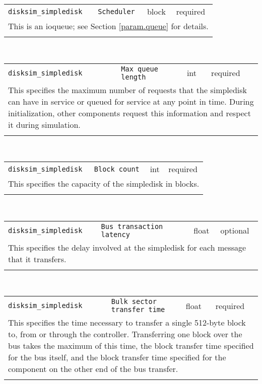 \noindent 
\begin{tabular}{|p{1.5in}|p{3.5in}|p{0.5in}|p{0.5in}|}
\cline{1-4}
\texttt{disksim\_simpledisk} & \texttt{Scheduler} & block & required \\ 
\cline{1-4}
\multicolumn{4}{|p{6in}|}{
This is an ioqueue; see Section \ref{param.queue} for details.
}\\ 
\cline{1-4}
\multicolumn{4}{p{5in}}{}\\
\end{tabular}\\ 
\noindent 
\begin{tabular}{|p{1.5in}|p{3.5in}|p{0.5in}|p{0.5in}|}
\cline{1-4}
\texttt{disksim\_simpledisk} & \texttt{Max queue length} & int & required \\ 
\cline{1-4}
\multicolumn{4}{|p{6in}|}{
This specifies the maximum number of requests that the simpledisk can have
in service or queued for service at any point in time. During
initialization, other components request this information and respect
it during simulation.
}\\ 
\cline{1-4}
\multicolumn{4}{p{5in}}{}\\
\end{tabular}\\ 
\noindent 
\begin{tabular}{|p{1.5in}|p{3.5in}|p{0.5in}|p{0.5in}|}
\cline{1-4}
\texttt{disksim\_simpledisk} & \texttt{Block count} & int & required \\ 
\cline{1-4}
\multicolumn{4}{|p{6in}|}{
This specifies the capacity of the simpledisk in blocks.
}\\ 
\cline{1-4}
\multicolumn{4}{p{5in}}{}\\
\end{tabular}\\ 
\noindent 
\begin{tabular}{|p{1.5in}|p{3.5in}|p{0.5in}|p{0.5in}|}
\cline{1-4}
\texttt{disksim\_simpledisk} & \texttt{Bus transaction latency} & float & optional \\ 
\cline{1-4}
\multicolumn{4}{|p{6in}|}{
This specifies the delay involved at the simpledisk for each message that
it transfers.
}\\ 
\cline{1-4}
\multicolumn{4}{p{5in}}{}\\
\end{tabular}\\ 
\noindent 
\begin{tabular}{|p{1.5in}|p{3.5in}|p{0.5in}|p{0.5in}|}
\cline{1-4}
\texttt{disksim\_simpledisk} & \texttt{Bulk sector transfer time} & float & required \\ 
\cline{1-4}
\multicolumn{4}{|p{6in}|}{
This specifies the time necessary to transfer a single 512-byte block to,
from or through the controller. Transferring one block over the bus
takes the maximum of this time, the block transfer time specified for
the bus itself, and the block transfer time specified for the
component on the other end of the bus transfer.
}\\ 
\cline{1-4}
\multicolumn{4}{p{5in}}{}\\
\end{tabular}\\ 
